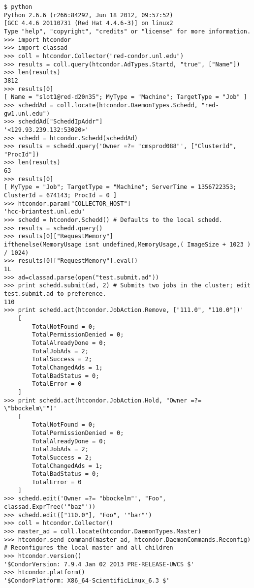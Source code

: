 \footnotesize
\begin{verbatim}
$ python
Python 2.6.6 (r266:84292, Jun 18 2012, 09:57:52) 
[GCC 4.4.6 20110731 (Red Hat 4.4.6-3)] on linux2
Type "help", "copyright", "credits" or "license" for more information.
>>> import htcondor
>>> import classad
>>> coll = htcondor.Collector("red-condor.unl.edu")
>>> results = coll.query(htcondor.AdTypes.Startd, "true", ["Name"])
>>> len(results)
3812
>>> results[0]
[ Name = "slot1@red-d20n35"; MyType = "Machine"; TargetType = "Job" ]
>>> scheddAd = coll.locate(htcondor.DaemonTypes.Schedd, "red-gw1.unl.edu")
>>> scheddAd["ScheddIpAddr"]
'<129.93.239.132:53020>'
>>> schedd = htcondor.Schedd(scheddAd)
>>> results = schedd.query('Owner =?= "cmsprod088"', ["ClusterId", "ProcId"])
>>> len(results)
63
>>> results[0]
[ MyType = "Job"; TargetType = "Machine"; ServerTime = 1356722353; ClusterId = 674143; ProcId = 0 ]
>>> htcondor.param["COLLECTOR_HOST"]
'hcc-briantest.unl.edu'
>>> schedd = htcondor.Schedd() # Defaults to the local schedd.
>>> results = schedd.query()
>>> results[0]["RequestMemory"]
ifthenelse(MemoryUsage isnt undefined,MemoryUsage,( ImageSize + 1023 ) / 1024)
>>> results[0]["RequestMemory"].eval()
1L
>>> ad=classad.parse(open("test.submit.ad"))
>>> print schedd.submit(ad, 2) # Submits two jobs in the cluster; edit test.submit.ad to preference.
110
>>> print schedd.act(htcondor.JobAction.Remove, ["111.0", "110.0"])'
    [
        TotalNotFound = 0; 
        TotalPermissionDenied = 0; 
        TotalAlreadyDone = 0; 
        TotalJobAds = 2; 
        TotalSuccess = 2; 
        TotalChangedAds = 1; 
        TotalBadStatus = 0; 
        TotalError = 0
    ]
>>> print schedd.act(htcondor.JobAction.Hold, "Owner =?= \"bbockelm\"")'
    [
        TotalNotFound = 0; 
        TotalPermissionDenied = 0; 
        TotalAlreadyDone = 0; 
        TotalJobAds = 2; 
        TotalSuccess = 2; 
        TotalChangedAds = 1; 
        TotalBadStatus = 0; 
        TotalError = 0
    ]
>>> schedd.edit('Owner =?= "bbockelm"', "Foo", classad.ExprTree('"baz"'))
>>> schedd.edit(["110.0"], "Foo", '"bar"')
>>> coll = htcondor.Collector()
>>> master_ad = coll.locate(htcondor.DaemonTypes.Master)
>>> htcondor.send_command(master_ad, htcondor.DaemonCommands.Reconfig) # Reconfigures the local master and all children
>>> htcondor.version()
'$CondorVersion: 7.9.4 Jan 02 2013 PRE-RELEASE-UWCS $'
>>> htcondor.platform()
'$CondorPlatform: X86_64-ScientificLinux_6.3 $'

\end{verbatim}
\normalsize

